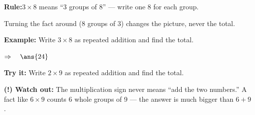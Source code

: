 \documentclass[12pt]{article}
\begin{document}
\begin{formulabox}
\textbf{Rule:}\quad $3 \times 8$ means ``3 groups of 8'' --- write one 8 for each group.\par
Turning the fact around (8 groups of 3) changes the picture, never the total.
\end{formulabox}

\begin{examplebox}
\textbf{Example:} Write $3 \times 8$ as repeated addition and find the total.

$\Rightarrow\quad\ans{24}$
\end{examplebox}

\begin{tryitbox}
\textbf{Try it:} Write $2 \times 9$ as repeated addition and find the total.\\[2pt]
\end{tryitbox}

\begin{watchoutbox}
\textbf{(!) Watch out:} The multiplication sign never means ``add the two numbers.'' A fact like $6 \times 9$ counts 6 whole groups of 9 --- the answer is much bigger than $6 + 9$.
\end{watchoutbox}
\end{document}
